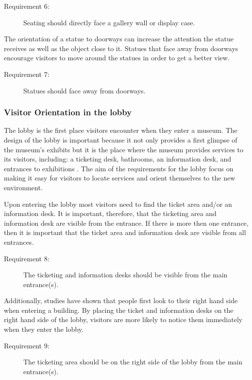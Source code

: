 \documentclass[12pt]{ucthesis}
\begin{document}
\begin{description}
\item[Requirement 6:] Seating should directly face a gallery wall or display case.
\end{description}

The orientation of a statue to doorways can increase the attention the statue receives as well as the object close to it. Statues that face away from doorways encourage visitors to move around the statues in order to get a better view.  
\begin{description}
\item[Requirement 7:] Statues should face away from doorways.
\end{description}

\subsubsection{Visitor Orientation in the lobby}
The lobby is the first place visitors encounter when they enter a museum. The design of the lobby is important because it not only provides a first glimpse of the museum's exhibits but it is the place where the museum provides services to its visitors, including: a ticketing desk, bathrooms, an information desk, and entrances to exhibitions \cite{Bitgood02}. The aim of the requirements for the lobby focus on making it easy for visitors to locate services and orient themselves to the new environment. 

Upon entering the lobby most visitors need to find the ticket area and/or an information desk. It is important, therefore, that the ticketing area and information desk are visible from the entrance. If there is more then one entrance, then it is important that the ticket area and information desk are visible from all entrances. 

\begin{description}
\item[Requirement 8:] The ticketing and information desks should be visible from the main entrance(s).
\end{description}

Additionally, studies have shown that people first look to their right hand side when entering a building. By placing the ticket and information desks on the right hand side of the lobby, visitors are more likely to notice them immediately when they enter the lobby. 

\begin{description}
\item[Requirement 9:] The ticketing area should be on the right side of the lobby from the main entrance(s).
\end{description}
\end{document}
